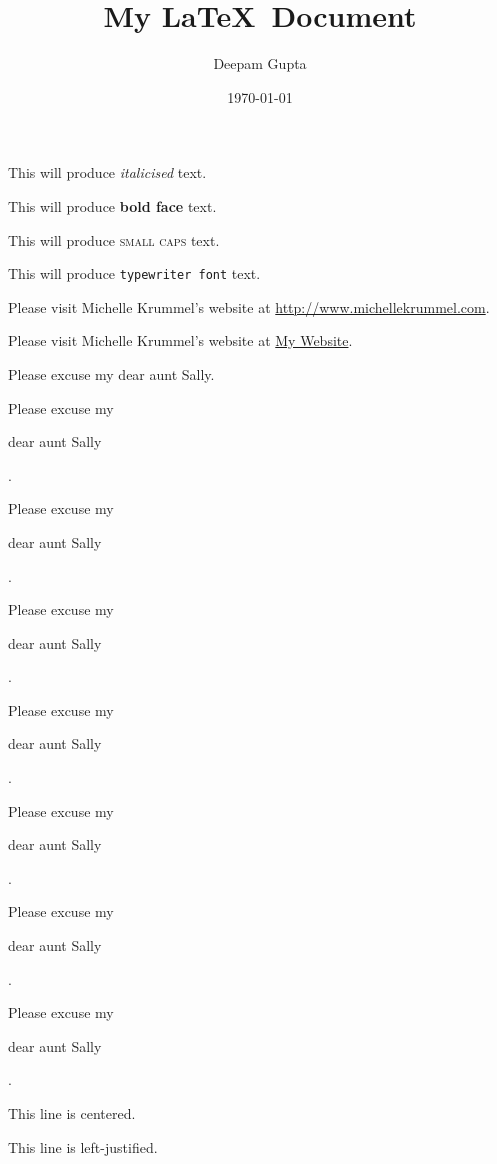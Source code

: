 \documentclass[11pt]{article}
\title{My \LaTeX\ Document}
\author{Deepam Gupta}
\date{\today}
\begin{document}
\tableofcontents
\maketitle
This will produce \textit{italicised} text.

This will produce \textbf{bold face} text.

This will produce \textsc{small caps} text.

This will produce \texttt{typewriter font} text.

Please visit Michelle Krummel's website at \url{http://www.michellekrummel.com}.

Please visit Michelle Krummel's website at \href{http://www.michellekrummel.com}{My Website}.

\vspace{1cm}

Please excuse my dear aunt Sally. 
 
Please excuse my \begin{large}dear aunt Sally\end{large}. 


Please excuse my \begin{Large}dear aunt Sally\end{Large}. 

Please excuse my \begin{huge}dear aunt Sally\end{huge}.

Please excuse my \begin{Huge}dear aunt Sally\end{Huge}.

Please excuse my \begin{normalsize}dear aunt Sally\end{normalsize}.

Please excuse my \begin{scriptsize}dear aunt Sally\end{scriptsize}.

Please excuse my \begin{tiny}dear aunt Sally\end{tiny}.

\vspace{1cm}

\begin{center} This line is centered. \end{center}

\begin{flushleft} This line is left-justified. \end{flushleft}
\end{document}
